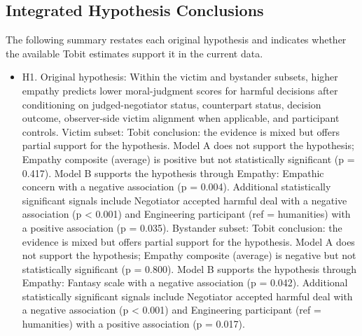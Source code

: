 \documentclass[11pt]{article}
\begin{document}
\subsection{Integrated Hypothesis Conclusions}
The following summary restates each original hypothesis and indicates whether the available Tobit estimates support it in the current data.
\begin{itemize}
\item H1. Original hypothesis: Within the victim and bystander subsets, higher empathy predicts lower moral-judgment scores for harmful decisions after conditioning on judged-negotiator status, counterpart status, decision outcome, observer-side victim alignment when applicable, and participant controls. Victim subset: Tobit conclusion: the evidence is mixed but offers partial support for the hypothesis. Model A does not support the hypothesis; Empathy composite (average) is positive but not statistically significant (p = 0.417). Model B supports the hypothesis through Empathy: Empathic concern with a negative association (p = 0.004). Additional statistically significant signals include Negotiator accepted harmful deal with a negative association (p < 0.001) and Engineering participant (ref = humanities) with a positive association (p = 0.035). Bystander subset: Tobit conclusion: the evidence is mixed but offers partial support for the hypothesis. Model A does not support the hypothesis; Empathy composite (average) is negative but not statistically significant (p = 0.800). Model B supports the hypothesis through Empathy: Fantasy scale with a negative association (p = 0.042). Additional statistically significant signals include Negotiator accepted harmful deal with a negative association (p < 0.001) and Engineering participant (ref = humanities) with a positive association (p = 0.017).

\end{itemize}
\end{document}
